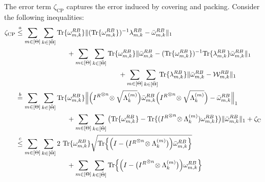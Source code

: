 \noindent The error term $\zeta_{\text{CP}}$ captures the error induced by covering and packing. Consider the following inequalities:
\begin{align*}
    \zeta_{\text{CP}} 
    &\overset{a}{\leq} \sum_{m \in [\Theta]}\sum_{\substack{k\in [\bTheta]}} \Tr\{\omega^{\refe B}_{m,k}\}\|(\Tr\{\omega^{\refe B}_{m,k}\})^{-1}\lambda_{m,k}^{\refe B} -  \omegabar^{\refe B}_{m,k}\|_1 \\
    &\hspace{75pt}+ \sum_{m \in [\Theta]}\sum_{\substack{k\in [\bTheta]}} \Tr\{\omega^{\refe B}_{m,k}\} \|\omegabar^{\refe B}_{m,k} - (\Tr\{\omega^{\refe B}_{m,k}\})^{-1}\Tr\{\lambda_{m,k}^{\refe B}\}\omegabar^{\refe B}_{m,k}\|_1
    \\
    &\hspace{150pt}+ \sum_{m \in [\Theta]}\sum_{\substack{k\in [\bTheta]}}\Tr\{\lambda_{m,k}^{\refe B}\}\|\omegabar_{m,k}^{\refe B} -  \calW_{m,k}^{\refe B}\|_1\\
    &\overset{b}{=} \sum_{m \in [\Theta]}\sum_{\substack{k\in [\bTheta]}}\Tr\{\omega^{\refe B}_{m,k}\} \Big\|\Big({I^{\refe}}^{\tensor n} \!\tensor \sqrt{\Lambda_{k}^{(m)}}\Big)\omegabar^{\refe B}_{m,k}\Big({I^{\refe}}^{\tensor n} \!\tensor \sqrt{\Lambda_{k}^{(m)}}\Big) -  \omegabar^{\refe B}_{m,k}\Big\|_1 
    \\
    &\hspace{75pt} + \sum_{m \in [\Theta]}\sum_{\substack{k\in [\bTheta]}}\big(\Tr\{\omega^{\refe B}_{m,k}\}-\Tr\{({I^{\refe}}^{\tensor n} \!\tensor \Lambda_{k}^{(m)})\omega_{m,k}^{\refe B}\}\big) \|\omegabar^{\refe B}_{m,k}\|_1 + \zeta_{\text{C}}\\
    &\overset{c}{\leq}
    \sum_{m \in [\Theta]}\sum_{\substack{k\in [\bTheta]}} 2 \ \Tr\{\omega^{\refe B}_{m,k}\} \sqrt{\Tr\Big\{\Big( I-\big({I^{\refe}}^{\tensor n} \!\tensor \Lambda_{k}^{(m)}\big)\Big)\omegabar^{\refe B}_{m,k}\Big\}} 
    \\&\hspace{75pt}+\sum_{m \in [\Theta]}\sum_{\substack{k\in [\bTheta]}}\Tr\Big\{\Big( I-\big({I^{\refe}}^{\tensor n} \!\tensor \Lambda_{k}^{(m)}\big)\Big) \omega^{\refe B}_{m,k}\Big\}

\end{align*}
